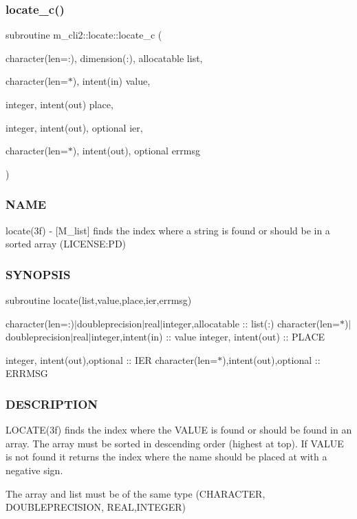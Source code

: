 \subsubsection{\texorpdfstring{locate\+\_\+c()}{locate\_c()}}
{\footnotesize\ttfamily subroutine m\+\_\+cli2\+::locate\+::locate\+\_\+c (\begin{DoxyParamCaption}\item[{character(len=\+:), dimension(\+:), allocatable}]{list,  }\item[{character(len=$\ast$), intent(in)}]{value,  }\item[{integer, intent(out)}]{place,  }\item[{integer, intent(out), optional}]{ier,  }\item[{character(len=$\ast$), intent(out), optional}]{errmsg }\end{DoxyParamCaption})\hspace{0.3cm}{\ttfamily [private]}}



\subsubsection*{N\+A\+ME}

locate(3f) -\/ \mbox{[}M\+\_\+list\mbox{]} finds the index where a string is found or should be in a sorted array (L\+I\+C\+E\+N\+SE\+:PD) 

\subsubsection*{S\+Y\+N\+O\+P\+S\+IS}

subroutine locate(list,value,place,ier,errmsg)

character(len=\+:)$\vert$doubleprecision$\vert$real$\vert$integer,allocatable \+:\+: list(\+:) character(len=$\ast$)$\vert$doubleprecision$\vert$real$\vert$integer,intent(in) \+:\+: value integer, intent(out) \+:\+: P\+L\+A\+CE

integer, intent(out),optional \+:\+: I\+ER character(len=$\ast$),intent(out),optional \+:\+: E\+R\+R\+M\+SG

\subsubsection*{D\+E\+S\+C\+R\+I\+P\+T\+I\+ON}

\begin{DoxyVerb}LOCATE(3f) finds the index where the VALUE is found or should
be found in an array. The array must be sorted in descending
order (highest at top). If VALUE is not found it returns the index
where the name should be placed at with a negative sign.

The array and list must be of the same type (CHARACTER, DOUBLEPRECISION,
REAL,INTEGER)
\end{DoxyVerb}


